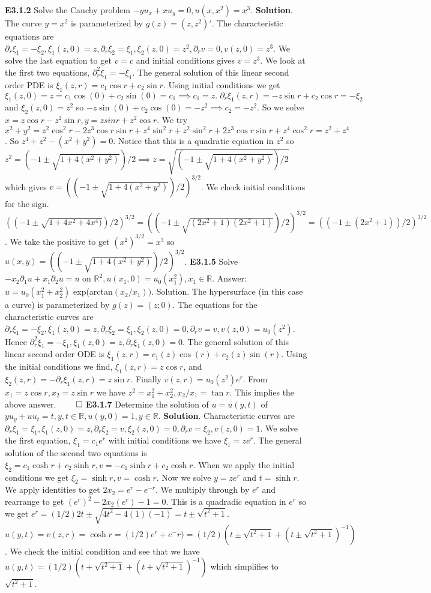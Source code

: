 \documentclass[6pt]{article}
\newcommand{\R}{\mathbb{R}}
\begin{document}
\begin{multicols}{2}
{\bf E3.1.2} Solve the Cauchy problem $-yu_x+xu_y=0, u(x,x^2)=x^3$. {\bf Solution}. The curve $y=x^2$ is parameterized by $g(z)=(z,z^2)'$. The characteristic equations are $\partial_r\xi_1=-\xi_2, \xi_1(z,0)=z, \partial_r\xi_2=\xi_1, \xi_2(z,0)=z^2, \partial_rv=0, v(z,0)=z^3$. We solve the last equation to get $v=c$ and initial conditions gives $v=z^3$. We look at the first two equations, $\partial_r^2 \xi_1=-\xi_1$.  The general solution of this linear second order PDE is $\xi_1(z,r)=c_1 \cos r+c_2 \sin r$. Using initial conditions we get $\xi_1(z,0)=z=c_1 \cos (0)+c_2 \sin (0)=c_1\implies c_1=z. \; \partial_r\xi_1(z,r)=-z\sin r + c_2 \cos r = -\xi_2$ and $\xi_2(z,0)=z^2$ so $-z\sin (0) + c_2 \cos (0)=-z^2 \implies c_2=-z^2$. So we solve $x=z \cos r-z^2\sin r, y=zsinr +z^2 \cos r$. We try $x^2+y^2=z^2 \cos^2r-2z^3\cos r\sin r+z^4\sin^2r+z^2 \sin^2r+2z^3\cos r\sin r+z^4\cos^2r=z^2+z^4$. So $z^4+z^2-(x^2+y^2)=0$. Notice that this is a quadratic equation in $z^2$ so $z^2=(-1 \pm \sqrt{1+4(x^2+y^2)})/2 \implies z=\sqrt{(-1 \pm \sqrt{1+4(x^2+y^2)})/2}$ which gives $v=((-1 \pm \sqrt{1+4(x^2+y^2)})/2)^{3/2}$.  We check initial conditions for the sign. $((-1 \pm \sqrt{1+4x^2+4x^4)})/2)^{3/2}=((-1 \pm \sqrt{(2x^2+1)(2x^2+1)})/2)^{3/2}=((-1 \pm (2x^2+1))/2)^{3/2}$.  We take the positive to get $(x^2)^{3/2}=x^3$ so $u(x,y)=((-1 \pm \sqrt{1+4(x^2+y^2)})/2)^{3/2}$.
{\bf E3.1.5} Solve $-x_2\partial_1u+x_1\partial_2u=u$ on $\R^2,  u(x_1,0)=u_0(x_1^2), x_1 \in \R$. Answer:  $u=u_0(x_1^2+x_2^2)$ exp(arctan$(x_2/x_1))$.  Solution. The hypersurface (in this case a curve) is parameterized by $g(z)=(z; 0)$. The equations for the characteristic curves are $\partial_r \xi_1=-\xi_2, \xi_1(z,0)=z, \partial_r \xi_2=\xi_1, \xi_2(z,0)=0, \partial_r v = v, v(z,0)=u_0(z^2)$. Hence $\partial_r^2\xi_1=-\xi_1,\xi_1(z,0)=z, \partial_r\xi_1(z,0)=0$. The general solution of this linear second order ODE is $\xi_1(z,r)=c_1(z)\cos(r)+c_2(z)\sin(r)$. Using the initial conditions we find,  $\xi_1(z,r)=z\cos r$, and $\xi_2(z,r)=-\partial_r\xi_1(z,r)=z\sin r$. Finally $v(z,r)=u_0(z^2)e^r$.  From $x_1=z\cos r, x_2=z\sin r$ we have $z^2=x_1^2+x_2^2, x_2/x_1=\tan r$. This implies the above answer. $\qed$
{\bf E3.1.7} Determine the solution of $u=u(y,t)$ of $yu_y+uu_t=t, y,t \in \R, u(y,0)=1, y\in \R$. {\bf Solution}. Characteristic curves are $\partial_r\xi_1=\xi_1, \xi_1(z,0)=z, \partial_r\xi_2=v, \xi_2(z,0)=0, \partial_rv=\xi_2,  v(z,0)=1$. We solve the first equation, $\xi_1=c_1e^r$ with initial conditions we have $\xi_1=ze^r$.  The general solution of the second two equations is $\xi_2 = c_1 \cosh r+c_2 \sinh r, v = -c_1 \sinh r + c_2 \cosh r$.  When we apply the initial conditions we get $\xi_2=\sinh r, v=\cosh r$.  Now we solve $y=ze^r$ and $t = \sinh r$. We apply identities to get $2x_2=e^r-e^{-r}$.  We multiply through by $e^r$ and rearrange to get $(e^r)^2-2x_2(e^r)-1=0$.  This is a quadradic equation in $e^r$ so we get $e^r=(1/2)2t\pm \sqrt{4t^2-4(1)(-1)}=t\pm \sqrt{t^2+1}$.  $u(y,t)=v(z,r)=\cosh r=(1/2)e^r+e^-r)=(1/2)(t\pm \sqrt{t^2+1}+(t\pm \sqrt{t^2+1})^{-1})$. We check the initial condition and see that we have $u(y,t)=(1/2)(t+ \sqrt{t^2+1}+(t+ \sqrt{t^2+1})^{-1})$ which simplifies to $\sqrt{t^2+1}$.

\end{multicols}
\end{document}
